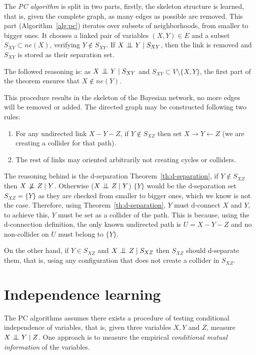 The \emph{PC algorithm} is split in two parts, firstly, the skeleton structure is learned, that is, given the complete graph, as many edges as possible are removed. This part (Algorithm~\ref{alg:pc}) iterates over subsets of neighborhoods, from smaller to bigger ones. It chooses a linked pair of variables \((X,Y) \in E\) and
a subset \(S_{XY} \subset ne(X)\), verifying \(Y \notin S_{XY}\). If \(X \bigCI Y \mid S_{XY}\), then the link is removed and \(S_{XY}\) is stored as their separation set.

The followed reasoning is: as \(X \bigCI Y \mid S_{XY}\) and \(S_{XY} \subset V \setminus \{X,Y\}\), the first part of the theorem ensures that \(X \notin ne(Y)\).

This procedure results in the skeleton of the Bayesian network, no more edges will be removed or added. The directed graph may be constructed following two rules:
\begin{enumerate}
  \item For any undirected link \(X - Y - Z\), if \(Y \notin S_{XZ}\) then set
    \(X \to Y \leftarrow Z\) (we are creating a collider for that path).
  \item The rest of links may oriented arbitrarily not
creating cycles or colliders.
\end{enumerate}
The reasoning behind is the d-separation Theorem~\ref{th:d-separation}, if \(Y \notin S_{XZ}\) then \(X \bigCD Z \mid Y\). Otherwise (\(X \bigCI Z \mid Y\)) \(\{Y\}\) would be the d-separation set \(S_{XZ} = \{Y\}\) as they are checked from smaller to bigger ones, which we know is not the case. Therefore, using Theorem~\ref{th:d-separation}, \(Y\) must d-connect \(X\) and \(Y\), to achieve this, \(Y\)  must be set as a collider of the path. This is because, using the d-connection definition, the only known undirected path is \(U = X - Y - Z\) and no non-collider on \(U\) must belong to \(\{Y\}\).

On the other hand, if \(Y \in S_{XZ}\) and \(X \bigCI Z \mid S_{XZ}\) then \(S_{XZ}\) should d-separate them, that is, using any configuration that does not create a collider in \(S_{XZ}\).

\section{Independence learning}

The PC algorithms assumes there exists a procedure of testing conditional independence of variables, that is, given three variables \(X, Y\) and \( Z \),  measure \(X \bigCI Y \mid Z\). One approach is to measure the empirical \emph{conditional mutual information} of the variables.

